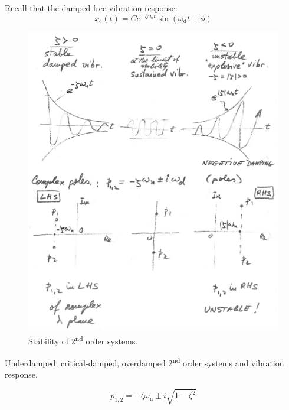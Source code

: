 \documentclass[12pt,letter]{article}
\numberwithin{ex}{section} %
\numberwithin{re}{section} %
\numberwithin{equation}{section}	%
\begin{document}
Recall that the damped free vibration response:
\begin{equation}
x_\text{c}(t) = C e^{-\zeta \omega_\text{n} t} \sin (\omega_\text{d} t + \phi)
\end{equation}
\begin{figure}[H]
	\centering
	\includegraphics[width=6.5in]{../figures/stability_2nd_order.png}
	\caption{Stability of 2\textsuperscript{nd} order systems.}
\end{figure}

Underdamped, critical-damped, overdamped 2\textsuperscript{nd} order systems and vibration response. 


\begin{equation}
p_{1,2} = -\zeta \omega_\text{n} \pm i  \sqrt{1 - \zeta^2}
\end{equation}
\end{document}
